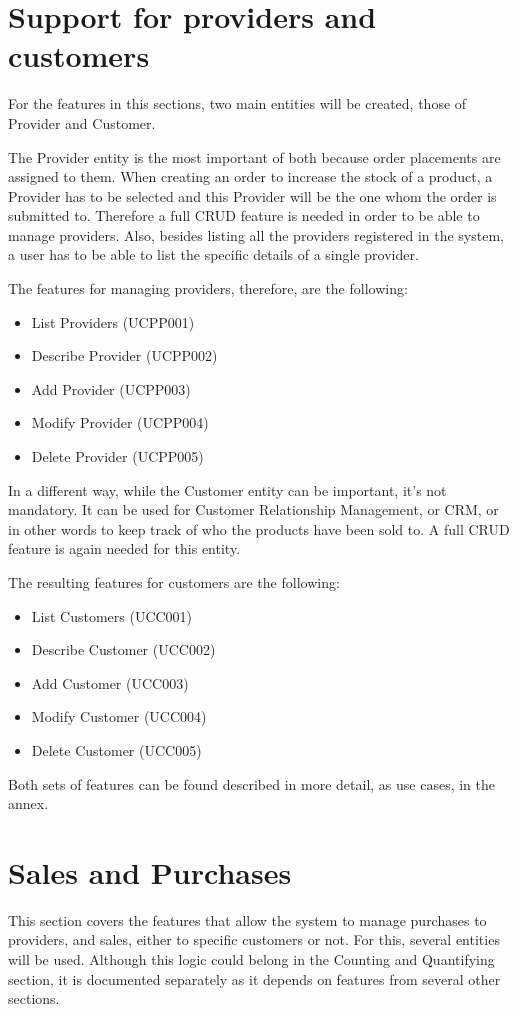 \section{Support for providers and customers}
For the features in this sections, two main entities will be created, those of Provider and Customer.

The Provider entity is the most important of both because order placements are assigned to them. When creating an order to increase the stock of a product, a Provider has to be selected and this Provider will be the one whom the order is submitted to. Therefore a full CRUD feature is needed in order to be able to manage providers. Also, besides listing all the providers registered in the system, a user has to be able to list the specific details of a single provider.

The features for managing providers, therefore, are the following:

\begin{itemize}
\item List Providers (UCPP001)
\item Describe Provider (UCPP002)
\item Add Provider (UCPP003)
\item Modify Provider (UCPP004)
\item Delete Provider (UCPP005)
\end{itemize}

In a different way, while the Customer entity can be important, it’s not mandatory. It can be used for Customer Relationship Management, or CRM, or in other words to keep track of who the products have been sold to. A full CRUD feature is again needed for this entity.

The resulting features for customers are the following:

\begin{itemize}
\item List Customers (UCC001)
\item Describe Customer (UCC002)
\item Add Customer (UCC003)
\item Modify Customer (UCC004)
\item Delete Customer (UCC005)
\end{itemize}

Both sets of features can be found described in more detail, as use cases, in the annex.

\section{Sales and Purchases}
This section covers the features that allow the system to manage purchases to providers, and sales, either to specific customers or not. For this, several entities will be used. Although this logic could belong in the Counting and Quantifying section, it is documented separately as it depends on features from several other sections. 

